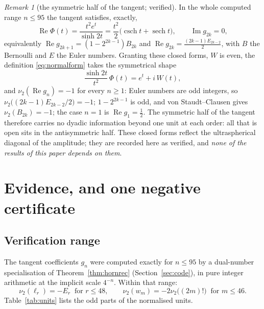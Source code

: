 \documentclass[12pt]{amsart}
\theoremstyle{definition}
\theoremstyle{remark}
\newtheorem{remark}[theorem]{Remark}
\begin{document}
\begin{remark}[the symmetric half of the tangent; verified]\label{rem:identityR}
In the whole computed range $n\le95$ the tangent satisfies, exactly,
\[
  \operatorname{Re}\Phi(t)=\frac{t^2e^t}{\sinh2t} =\frac{t^2}2\bigl(\operatorname{csch}t+\operatorname{sech}t\bigr),
  \qquad \operatorname{Im}g_{2k}=0 ,
\]
equivalently $\operatorname{Re}g_{2k+1}=(1-2^{2k-1})B_{2k}$ and $\operatorname{Re}g_{2k}=\frac{(2k-1)E_{2k-2}}2$, with $B$ the Bernoulli and $E$ the Euler numbers.  Granting these closed forms, $W$ is even, the definition \eqref{eq:normalform} takes the symmetrical shape
\[
  \frac{\sinh2t}{t^2}\,\Phi(t)=e^t+i\,W(t),
\]
and $\nu_2(\operatorname{Re}g_n)=-1$ for every $n\ge1$: Euler numbers are odd integers, so $\nu_2\bigl((2k-1)E_{2k-2}/2\bigr)=-1$; $1-2^{2k-1}$ is odd, and von Staudt--Clausen gives $\nu_2(B_{2k})=-1$; the case $n=1$ is $\operatorname{Re}g_1=\frac12$.  The symmetric half of the tangent therefore carries no dyadic information beyond one unit at each order: all that is open sits in the antisymmetric half.  These closed forms reflect the ultraspherical diagonal of the amplitude; they are recorded here as verified, and \emph{none of the results of this paper depends on them}.
\end{remark}

\section{Evidence, and one negative certificate}\label{sec:evidence}

\subsection{Verification range}

The tangent coefficients $g_n$ were computed exactly for $n\le95$ by a dual-number specialisation of Theorem~\ref{thm:hornrec} (Section~\ref{sec:code}), in pure integer arithmetic at the implicit scale $4^{-n}$.  Within that range:
\[
  \nu_2(\ell_r)=-E_r\ \text{ for }r\le48,\qquad
  \nu_2(w_m)=-2\nu_2\bigl((2m)!\bigr)\ \text{ for }m\le46 .
\]
Table~\ref{tab:units} lists the odd parts of the normalised units.
\end{document}

